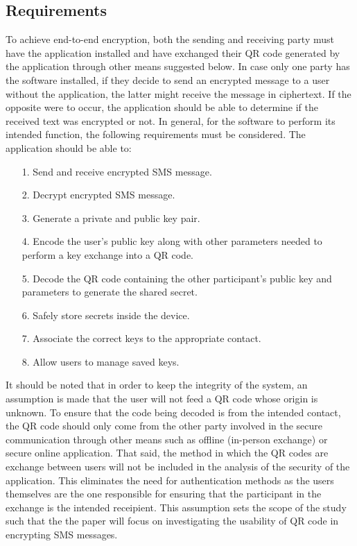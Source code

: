 \documentclass[journal]{./IEEE/IEEEtran}
\begin{document}
\subsection{Requirements}
To achieve end-to-end encryption, both the sending and receiving party must
have the application installed and have exchanged their QR code generated by
the application through other means suggested below. In case only one party
has the software installed, if they decide to send an encrypted message to
a user without the application, the latter might receive the message in
ciphertext. If the opposite were to occur, the application should be able to
determine if the received text was encrypted or not. In general, for the
software to perform its intended function, the following requirements must
be considered. The application should be able to:
\begin{itemize}
	\item[1.] Send and receive encrypted SMS message.
	\item[2.] Decrypt encrypted SMS message.
	\item[3.] Generate a private and public key pair.
	\item[4.] Encode the user's public key along with other parameters
		needed to perform a key exchange into a QR code.
	\item[5.] Decode the QR code containing the other participant's public
		key and parameters to generate the shared secret.
	\item[6.] Safely store secrets inside the device.
	\item[7.] Associate the correct keys to the appropriate contact.
	\item[8.] Allow users to manage saved keys.
\end{itemize}

It should be noted that in order to keep the integrity of the system,
an assumption is made that the user will not feed a QR code
whose origin is unknown. To ensure that the code being decoded is from the
intended contact, the QR code should only come from the other party involved
in the secure communication through other means such as offline
(in-person exchange) or secure online application. That said, the method in
which the QR codes are exchange between users will not be included in the
analysis of the security of the application. This eliminates the need
for authentication methods as the users themselves are the one responsible
for ensuring that the participant in the exchange is the intended receipient.
This assumption sets the scope of the study such that the the paper will focus
on investigating the usability of QR code in encrypting SMS messages.
\end{document}
